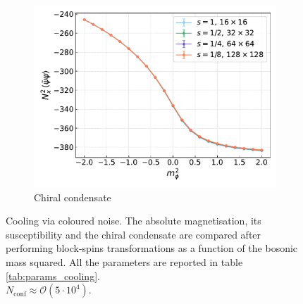 \begin{figure}[hbp]
\begin{subfigure}[b]{0.47\textwidth}
        \includegraphics[width=\textwidth]{figures/cooling/mass_scan/condensate.pdf}
        \caption{Chiral condensate}
    \end{subfigure}
    \caption[Cooling stochastic quantisation: fields as a function of the bosonic mass squared.]{Cooling via coloured noise. The absolute magnetisation, its susceptibility and the chiral condensate are compared after performing block-spins transformations as a function of the bosonic mass squared. All the parameters are reported in table \ref{tab:params_cooling}. \\ $N_\text{conf} \approx \mathcal{O}(5 \cdot 10^4)$.}
    \label{fig:cooling_M_psibarpsi_chi2}
\end{figure}
